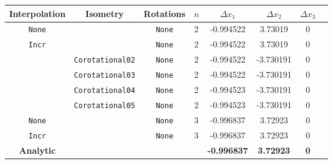 



\begin{tabular*}{\textwidth}{@{\extracolsep\fill}cccccccc@{}}
\toprule
\textbf{Interpolation} & \textbf{Isometry}  & \textbf{Rotations} & 
\(n\)  & \(\Delta x_1\) & \(\Delta x_2\) & \(\Delta x_3\)  \\
\midrule
  \texttt{None} & \Spherical{} & \texttt{None} & 2  & -0.994522 & 3.73019 & 0 \\
\texttt{Incr} & \Spherical{} & \texttt{None} & 2  & -0.994522 & 3.73019 & 0 \\
\ForceFrame{} & \texttt{Corotational02} & \texttt{None} & 2 & -0.994522 & -3.730191 & 0 \\
\ForceFrame{} & \texttt{Corotational03} & \texttt{None} & 2 & -0.994522 & -3.730191 & 0 \\
\ForceFrame{} & \texttt{Corotational04} & \texttt{None} & 2 & -0.994523 & -3.730191 & 0 \\
\ForceFrame{} & \texttt{Corotational05} & \texttt{None} & 2 & -0.994523 & -3.730191 & 0 \\
%
  \hline
  \texttt{None} & \Spherical{} & \texttt{None} & 3 & -0.996837 & 3.72923 & 0 \\
  \texttt{Incr} & \Spherical{} & \texttt{None} & 3 & -0.996837 & 3.72923 & 0 \\ %
\midrule
\textbf{Analytic} &             &               &   & \textbf{-0.996837} & \textbf{3.72923} & \textbf{0} \\ %
\hline
\end{tabular*}
